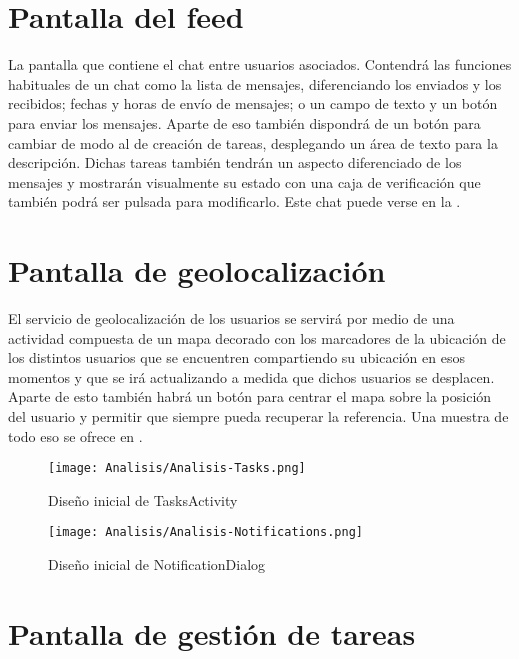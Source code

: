\section{Pantalla del feed}
\label{sec:pantalla_feed}

La pantalla que contiene el chat entre usuarios asociados. Contendrá las funciones habituales de un chat como la lista de mensajes, diferenciando los enviados y los recibidos; fechas y horas de envío de mensajes; o un campo de texto y un botón para enviar los mensajes. Aparte de eso también dispondrá de un botón para cambiar de modo al de creación de tareas, desplegando un área de texto para la descripción. Dichas tareas también tendrán un aspecto diferenciado de los mensajes y mostrarán visualmente su estado con una caja de verificación que también podrá ser pulsada para modificarlo. Este chat puede verse en la .

\section{Pantalla de geolocalización}
\label{sec:pantalla_geolocalizacion}

El servicio de geolocalización de los usuarios se servirá por medio de una actividad compuesta de un mapa decorado con los marcadores de la ubicación de los distintos usuarios que se encuentren compartiendo su ubicación en esos momentos y que se irá actualizando a medida que dichos usuarios se desplacen. Aparte de esto también habrá un botón para centrar el mapa sobre la posición del usuario y permitir que siempre pueda recuperar la referencia. Una muestra de todo eso se ofrece en .

\begin{figure}[H]
    \centering
    \begin{minipage}{0.45\textwidth}
        \centering
        \texttt{[image: Analisis/Analisis-Tasks.png]}
        \caption{Diseño inicial de TasksActivity}
        \label{fig:ui:tasks}
    \end{minipage}\hfill
    \begin{minipage}{0.45\textwidth}
        \centering
        \texttt{[image: Analisis/Analisis-Notifications.png]}
        \caption{Diseño inicial de NotificationDialog}
        \label{fig:ui:notification}
    \end{minipage}
\end{figure}

\section{Pantalla de gestión de tareas}
\label{sec:pantalla_tareas}

